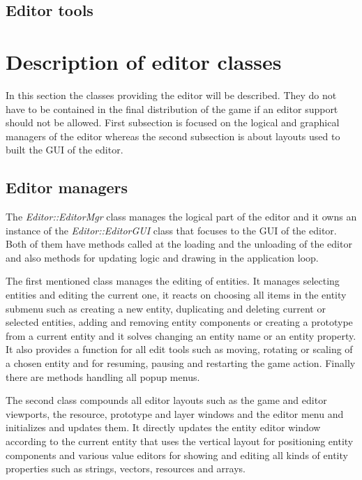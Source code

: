 \subsection{Editor tools}

\section{Description of editor classes}

In this section the classes providing the editor will be described. They do not have to be contained in the final distribution of the game if an editor support should not be allowed. First subsection is focused on the logical and graphical managers of the editor whereas the second subsection is about layouts used to built the GUI of the editor.

\subsection{Editor managers}

The \emph{Editor::EditorMgr} class manages the logical part of the editor and it owns an instance of the \emph{Editor::EditorGUI} class that focuses to the GUI of the editor. Both of them have methods called at the loading and the unloading of the editor and also methods for updating logic and drawing in the application loop.

The first mentioned class manages the editing of entities. It manages selecting entities and editing the current one, it reacts on choosing all items in the entity submenu such as creating a new entity, duplicating and deleting current or selected entities, adding and removing entity components or creating a prototype from a current entity and it solves changing an entity name or an entity property. It also provides a function for all edit tools such as moving, rotating or scaling of a chosen entity and for resuming, pausing and restarting the game action. Finally there are methods handling all popup menus.

The second class compounds all editor layouts such as the game and editor viewports, the resource, prototype and layer windows and the editor menu and initializes and updates them. It directly updates the entity editor window according to the current entity that uses the vertical layout for positioning entity components and various value editors for showing and editing all kinds of entity properties such as strings, vectors, resources and arrays.

